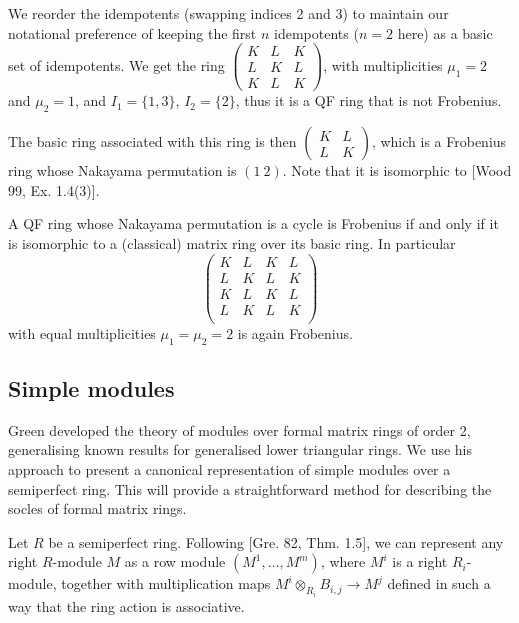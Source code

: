 \documentclass[11pt]{article}
\theoremstyle{plain}
\theoremstyle{remark}
\theoremstyle{plain}
\begin{document}
 We reorder the idempotents (swapping indices 2 and 3) to maintain our notational preference of keeping the first $n$ idempotents ($n=2$ here) as a basic set of idempotents. We get the ring $\begin{pmatrix}
     K&L&K\\
     L&K&L\\
     K& L&K
 \end{pmatrix}$, with multiplicities $\mu_1=2$ and $\mu_2=1$, and $I_1=\{1, 3\}$, $I_2=\{2\}$, thus it is a QF ring that is not Frobenius.
 
 The basic ring associated with this ring is then $\begin{pmatrix}
     K&L\\
     L&K
 \end{pmatrix}$, which is a Frobenius ring whose Nakayama permutation is $(1~2)$. Note that it is isomorphic to [Wood 99, Ex. 1.4(3)].
 
 A QF ring whose Nakayama permutation is a cycle is Frobenius if and only if it is isomorphic to a (classical) matrix ring over its basic ring. In particular
\[
\left(
\begin{array}{cc|cc}
       K&L&K&L\\
     L&K&L&K\\
     \hline
     K&L&K&L\\
     L&K&L&K\\
\end{array}
\right)
\] with equal multiplicities $\mu_1=\mu_2=2$ is again Frobenius. 




\subsection{Simple modules}\label{SecsempSimples}

 Green developed the theory of modules over formal matrix rings of order 2, generalising known results for generalised lower
triangular rings. We use his approach to present a canonical representation of simple modules over a semiperfect ring. This will provide a straightforward method for describing the socles of formal matrix rings.

\smallskip


Let $R$ be a semiperfect ring. Following [Gre. 82, Thm. 1.5], we can represent any right $R$-module $M$ as a row module $(M^1,\dots, M^m)$, where $M^i$ is a right $R_i$-module, together with multiplication maps $M^i\otimes_{R_i} B_{i,j}\to M^j$ defined in such a way that the ring action is associative. 
\end{document}
